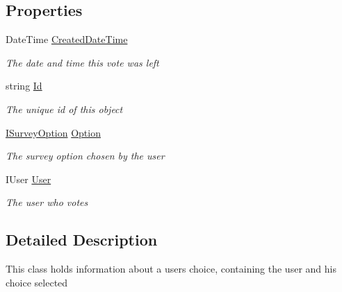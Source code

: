 \subsection*{Properties}
\begin{DoxyCompactItemize}
\item 
Date\+Time \hyperlink{class_plex_byte_1_1_mo_cap_1_1_interactions_1_1_vote_ae7cb6cc9d86a52d927f689c926a7e8a4}{Created\+Date\+Time}
\begin{DoxyCompactList}\small\item\em The date and time this vote was left \end{DoxyCompactList}\item 
string \hyperlink{class_plex_byte_1_1_mo_cap_1_1_interactions_1_1_vote_a9ee8f835267b3c453ca79564e11a365f}{Id}
\begin{DoxyCompactList}\small\item\em The unique id of this object \end{DoxyCompactList}\item 
\hyperlink{interface_plex_byte_1_1_mo_cap_1_1_interactions_1_1_i_survey_option}{I\+Survey\+Option} \hyperlink{class_plex_byte_1_1_mo_cap_1_1_interactions_1_1_vote_a84ca623bee92a24c658a532234f06a8f}{Option}
\begin{DoxyCompactList}\small\item\em The survey option chosen by the user \end{DoxyCompactList}\item 
I\+User \hyperlink{class_plex_byte_1_1_mo_cap_1_1_interactions_1_1_vote_a704a068395851baacc22e71db46d3ea8}{User}
\begin{DoxyCompactList}\small\item\em The user who votes \end{DoxyCompactList}\end{DoxyCompactItemize}


\subsection{Detailed Description}
This class holds information about a users choice, containing the user and his choice selected 



